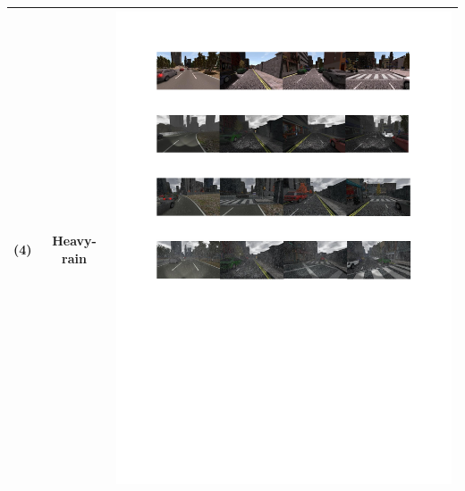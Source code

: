 \begin{table}[!t]
\begin{tabular}{|C{1cm}|c|C{13.5cm}|}
		(4)	& Heavy- rain & \begin{minipage}{.9\textwidth}\includegraphics[scale=.8,trim=2cm 12.5cm 2cm 14.3cm,clip]{examples.pdf}\end{minipage} \\ \hline
	\end{tabular}
\end{table}

